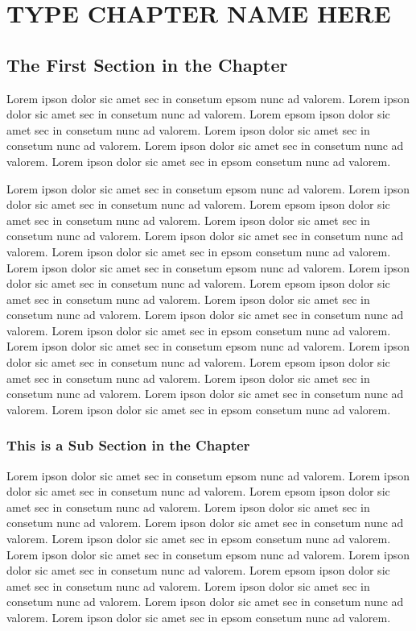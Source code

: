 \fancyhead[RO,LE]{\thepage}
\fancyfoot{} 
\chapter{TYPE CHAPTER NAME HERE}

\section{The First Section in the Chapter}
Lorem ipson dolor sic amet sec in consetum epsom nunc ad valorem. Lorem ipson dolor sic amet
sec in consetum nunc ad valorem. Lorem epsom ipson dolor sic amet sec in consetum nunc ad valorem. 
Lorem ipson dolor sic amet sec in consetum nunc ad valorem. Lorem ipson dolor sic amet
sec in consetum nunc ad valorem. Lorem ipson dolor sic amet sec in epsom consetum nunc ad valorem.

Lorem ipson dolor sic amet sec in consetum epsom nunc ad valorem. Lorem ipson dolor sic amet
sec in consetum nunc ad valorem. Lorem epsom ipson dolor sic amet sec in consetum nunc ad valorem. 
Lorem ipson dolor sic amet sec in consetum nunc ad valorem. Lorem ipson dolor sic amet
sec in consetum nunc ad valorem. Lorem ipson dolor sic amet sec in epsom consetum nunc ad valorem.
Lorem ipson dolor sic amet sec in consetum epsom nunc ad valorem. Lorem ipson dolor sic amet
sec in consetum nunc ad valorem. Lorem epsom ipson dolor sic amet sec in consetum nunc ad valorem. 
Lorem ipson dolor sic amet sec in consetum nunc ad valorem. Lorem ipson dolor sic amet
sec in consetum nunc ad valorem. Lorem ipson dolor sic amet sec in epsom consetum nunc ad valorem.
Lorem ipson dolor sic amet sec in consetum epsom nunc ad valorem. Lorem ipson dolor sic amet
sec in consetum nunc ad valorem. Lorem epsom ipson dolor sic amet sec in consetum nunc ad valorem. 
Lorem ipson dolor sic amet sec in consetum nunc ad valorem. Lorem ipson dolor sic amet
sec in consetum nunc ad valorem. Lorem ipson dolor sic amet sec in epsom consetum nunc ad valorem.

\subsection{This is a Sub Section in the Chapter}
Lorem ipson dolor sic amet sec in consetum epsom nunc ad valorem. Lorem ipson dolor sic amet
sec in consetum nunc ad valorem. Lorem epsom ipson dolor sic amet sec in consetum nunc ad valorem. 
Lorem ipson dolor sic amet sec in consetum nunc ad valorem. Lorem ipson dolor sic amet
sec in consetum nunc ad valorem. Lorem ipson dolor sic amet sec in epsom consetum nunc ad valorem.
Lorem ipson dolor sic amet sec in consetum epsom nunc ad valorem. Lorem ipson dolor sic amet
sec in consetum nunc ad valorem. Lorem epsom ipson dolor sic amet sec in consetum nunc ad valorem. 
Lorem ipson dolor sic amet sec in consetum nunc ad valorem. Lorem ipson dolor sic amet
sec in consetum nunc ad valorem. Lorem ipson dolor sic amet sec in epsom consetum nunc ad valorem.

